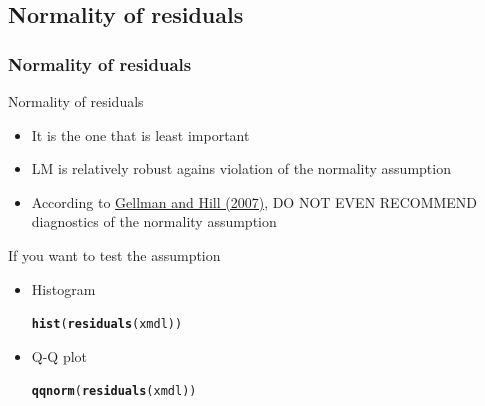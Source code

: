 \documentclass[10p]{beamer}\usepackage[]{graphicx}\usepackage[]{color}
\makeatletter
\newcommand{\hlstd}[1]{\textcolor[rgb]{0.345,0.345,0.345}{#1}}%
\newcommand{\hlkwd}[1]{\textcolor[rgb]{0.737,0.353,0.396}{\textbf{#1}}}%
\newenvironment{kframe}{%
 \def\at@end@of@kframe{}%
 \ifinner\ifhmode%
  \def\at@end@of@kframe{\end{minipage}}%
  \begin{minipage}{\columnwidth}%
 \fi\fi%
 \def\FrameCommand##1{\hskip\@totalleftmargin \hskip-\fboxsep
 \colorbox{shadecolor}{##1}\hskip-\fboxsep
     \hskip-\linewidth \hskip-\@totalleftmargin \hskip\columnwidth}%
 \MakeFramed {\advance\hsize-\width
   \@totalleftmargin\z@ \linewidth\hsize
   \@setminipage}}%
 {\par\unskip\endMakeFramed%
 \at@end@of@kframe}
\newenvironment{knitrout}{}{} %
\makeatother
\begin{document}
\subsection{Normality of residuals}
\begin{frame}
\frametitle{Normality of residuals}
Normality of residuals
\begin{itemize}
\item It is the one that is \alert{least important}
\item LM is relatively robust agains violation of the normality assumption
\item According to \href{http://book.naver.com/bookdb/book_detail.nhn?bid=2634403}{Gellman and Hill (2007)}, DO NOT EVEN RECOMMEND diagnostics of the normality assumption
\end{itemize}

If you want to test the assumption
\begin{itemize}
\item Histogram
\begin{knitrout}\scriptsize
{}\color{fgcolor}\begin{kframe}
\begin{alltt}
\hlkwd{hist}\hlstd{(}\hlkwd{residuals}\hlstd{(xmdl))}
\end{alltt}
\end{kframe}
\end{knitrout}
\item Q-Q plot
\begin{knitrout}\scriptsize
{}\color{fgcolor}\begin{kframe}
\begin{alltt}
\hlkwd{qqnorm}\hlstd{(}\hlkwd{residuals}\hlstd{(xmdl))}
\end{alltt}
\end{kframe}
\end{knitrout}
\end{itemize}
\end{frame}
\end{document}
